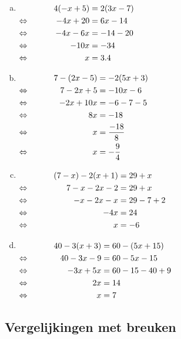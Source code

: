 \documentclass[12pt]{article}
\begin{document}
\begin{solution}
\vspace{-2\topsep}
\begin{enumerate}[(a)]
\item $\begin{aligned}[t]
     && 4(- x + 5)	&= 2(3x - 7)\\
\Leftrightarrow\mkern40mu &&   - 4x + 20	&= 6x - 14\\
\Leftrightarrow\mkern40mu &&   - 4x - 6x	&= -14 - 20\\
\Leftrightarrow\mkern40mu &&   - 10x	&= -34\\
\Leftrightarrow\mkern40mu &&   x	&= 3.4\\
\end{aligned}$
\item $\begin{aligned}[t]
     && 7 - (2x - 5)	&= - 2(5x + 3)\\
\Leftrightarrow\mkern40mu && 7 - 2x + 5	&= - 10x - 6\\
\Leftrightarrow\mkern40mu && - 2x + 10x	&= - 6 - 7 - 5\\
\Leftrightarrow\mkern40mu && 8x	&= - 18\\
\Leftrightarrow\mkern40mu && x	&= \dfrac{-18}{8}\\
\Leftrightarrow\mkern40mu && x	&= -\dfrac{9}{4}\\
\end{aligned}$
\item $\begin{aligned}[t]
     && (7 - x) - 2(x + 1)	&= 29 + x\\
\Leftrightarrow\mkern40mu && 7 - x - 2x - 2	&= 29 + x\\
\Leftrightarrow\mkern40mu && - x - 2x - x	&= 29 - 7 + 2\\
\Leftrightarrow\mkern40mu && - 4x	&= 24\\
\Leftrightarrow\mkern40mu && x	&= - 6\\
\end{aligned}$
\item $\begin{aligned}[t]
     && 40 - 3(x + 3)	&= 60 - (5x + 15)\\
\Leftrightarrow\mkern40mu && 40 - 3x - 9	&= 60 - 5x - 15\\
\Leftrightarrow\mkern40mu && - 3x + 5x	&= 60 - 15 - 40 + 9\\
\Leftrightarrow\mkern40mu && 2x	&= 14\\
\Leftrightarrow\mkern40mu && x	&= 7\\
\end{aligned}$
\end{enumerate}
\end{solution}

\subsection{Vergelijkingen met breuken}
\end{document}
